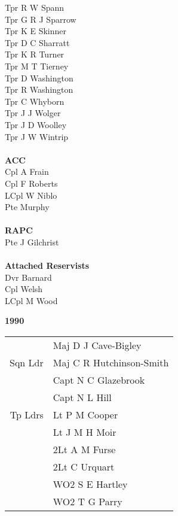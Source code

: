 \documentclass[a4paper,7pt]{book}
\begin{document}
\begin{multicols}{4}
  Tpr R W Spann \\
  Tpr G R J Sparrow \\
  Tpr K E Skinner \\
  Tpr D C Sharratt \\
  Tpr K R Turner \\
  Tpr M T Tierney \\
  Tpr D Washington \\
  Tpr R Washington \\
  Tpr C Whyborn \\
  Tpr J J Wolger \\
  Tpr J D Woolley \\
  Tpr J W Wintrip \\ \\
  \textbf{ACC} \\
  Cpl A Frain \\
  Cpl F Roberts \\
  LCpl W Niblo \\
  Pte Murphy \\ \\
  \textbf{RAPC} \\
  Pte J Gilchrist \\ \\
  \textbf{Attached Reservists} \\
  Dvr Barnard \\
  Cpl Welsh \\
  LCpl M Wood
\end{multicols}

\pagebreak

\begin{center}
  {
    \Huge
    \textbf{1990}
  }
\end{center}

\begin{center}
  \small
  \begin{tabular}{rl}
     & Maj D J Cave-Bigley \\
    Sqn Ldr & Maj C R Hutchinson-Smith \\
     & Capt N C Glazebrook \\
     & Capt N L Hill \\
    Tp Ldrs & Lt P M Cooper \\
     & Lt J M H Moir \\
     & 2Lt A M Furse \\
     & 2Lt C Urquart \\
     & WO2 S E Hartley \\
     & WO2 T G Parry \\
  \end{tabular}
\end{center}
\end{document}
